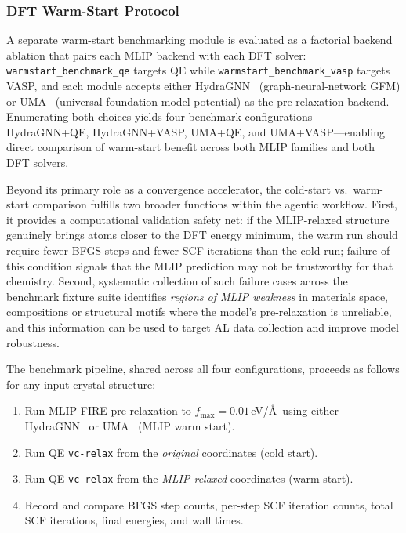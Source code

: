 \documentclass[conference]{IEEEtran}
\def\acs#1{#1}%
\begin{document}
\subsubsection{DFT Warm-Start Protocol}
A separate warm-start benchmarking module is evaluated as a factorial
backend ablation that pairs each \acs{MLIP} backend with each \acs{DFT} solver:
\texttt{warmstart\_benchmark\_qe} targets \acs{QE} while
\texttt{warmstart\_benchmark\_vasp} targets \acs{VASP}, and each module accepts
either HydraGNN~\cite{hydragnn} (graph-neural-network \acs{GFM}) or
UMA~\cite{wood2025uma} (universal foundation-model potential) as the
pre-relaxation backend. Enumerating both choices yields four benchmark
configurations---HydraGNN+\acs{QE}, HydraGNN+\acs{VASP}, UMA+\acs{QE}, and
UMA+\acs{VASP}---enabling direct comparison of warm-start benefit across both
\acs{MLIP} families and both \acs{DFT} solvers.

Beyond its primary role as a convergence accelerator, the cold-start
vs.\ warm-start comparison fulfills two broader functions within the agentic
workflow. First, it provides a computational validation safety net: if the
\acs{MLIP}-relaxed structure genuinely brings atoms closer to the \acs{DFT} energy
minimum, the warm run should require fewer \acs{BFGS} steps and fewer \acs{SCF}
iterations than the cold run; failure of this condition signals that the \acs{MLIP}
prediction may not be trustworthy for that chemistry. Second, systematic
collection of such failure cases across the benchmark fixture suite identifies
\emph{regions of \acs{MLIP} weakness} in materials space, compositions or
structural motifs where the model's pre-relaxation is unreliable, and this
information can be used to target \acs{AL} data collection and improve
model robustness.

The benchmark pipeline, shared across all four configurations, proceeds as follows
for any input crystal structure:

\begin{enumerate}
\item Run \acs{MLIP} \acs{FIRE} pre-relaxation to $f_\text{max} = 0.01$\,eV/\AA\ using
  either HydraGNN~\cite{hydragnn} or UMA~\cite{wood2025uma} (\acs{MLIP} warm start).
\item Run \acs{QE} \texttt{vc-relax} from the \emph{original} coordinates (cold
  start).
\item Run \acs{QE} \texttt{vc-relax} from the \emph{\acs{MLIP}-relaxed} coordinates
  (warm start).
\item Record and compare \acs{BFGS} step counts, per-step \acs{SCF} iteration counts,
  total \acs{SCF} iterations, final energies, and wall times.
\end{enumerate}
\end{document}
